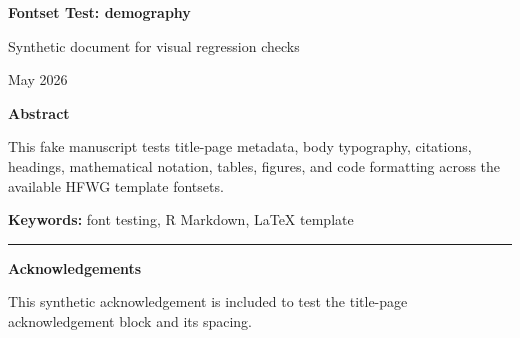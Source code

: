 \documentclass[12pt]{article}
\newif\ifhfwganon
\begin{document}
\begin{titlepage}
\thispagestyle{empty}

\vspace*{0.14\textheight}
\begin{center}


{\LARGE\bfseries Fontset Test: demography\par}

\vspace{0.25em}
{\large Synthetic document for visual regression checks\par}

\vspace{2em}

\begin{singlespace}
{\normalsize

\hfwgauthorblock

\par\vspace{2\baselineskip}
\hfwgseriesblock

\ifhfwganon\else
\vspace{0.5em}
{\small May 2026}\par
\fi

}
\end{singlespace}


\vspace{2em}

\begin{minipage}{0.8\textwidth}
\small\singlespacing
\textbf{Abstract}\par\vspace{0.25em}
This fake manuscript tests title-page metadata, body typography,
citations, headings, mathematical notation, tables, figures, and code
formatting across the available HFWG template fontsets.
\par\vspace{1em}
\noindent\textbf{Keywords: }font testing, R Markdown, LaTeX template
\end{minipage}

\vfill

\ifhfwganon\else
\begin{minipage}{0.8\textwidth}
\footnotesize\singlespacing
\noindent\rule{0.3\textwidth}{0.4pt}\par
\textbf{Acknowledgements}\par
This synthetic acknowledgement is included to test the title-page
acknowledgement block and its spacing.
\end{minipage}
\fi

\end{center}
\end{titlepage}
\fi\fi
\fi\fi
\end{document}
